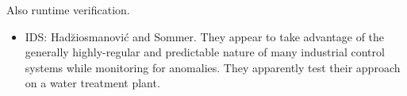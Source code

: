 Also runtime verification.

\begin{itemize}

\item IDS: Had\u ziosmanovi\'c and Sommer. They appear to take advantage of the
generally highly-regular and predictable nature of many industrial control
systems while monitoring for anomalies. They apparently test their approach on a
water treatment plant.


\end{itemize}

